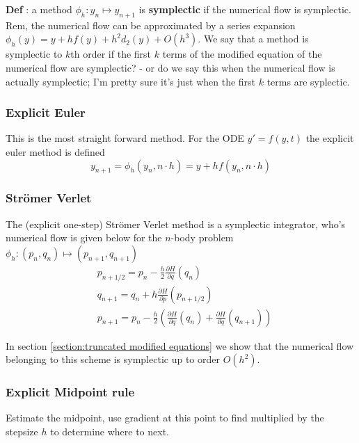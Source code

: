 \documentclass[12pt]{article}
\begin{document}
\textbf{Def} : a method $\phi_h : y_n\mapsto y_{n+1}$ is \textbf{symplectic} if the numerical flow is symplectic. Rem, the numerical flow can be approximated by a series expansion $\phi_h(y) = y + hf(y) + h^2d_2(y) + O(h^3)$. We say that a method is symplectic to $k$th order if the first $k$ terms of the modified equation of the numerical flow are symplectic? - or do we say this when the numerical flow is actually symplectic; I'm pretty sure it's just when the first $k$ terms are syplectic. 

\subsubsection{Explicit Euler}
This is the most straight forward method. For the ODE $y' = f(y,t)$ the explicit euler method is defined
\begin{equation}\label{eq:explicit euler}
y_{n+1} = \phi_h(y_n , n\cdot h) = y + h f(y_n, n\cdot h)
\end{equation}

\subsubsection{Str\"omer Verlet}
The (explicit one-step) Str\"omer Verlet method is a symplectic integrator, who's numerical flow is given below for the $n$-body problem $\phi_h : (p_n,q_n)\mapsto (p_{n+1},q_{n+1})$
\begin{equation}\label{eq:stromer verlet n body}
\begin{split}
    & p_{n+1/2} = p_n - \frac{h}{2}\frac{\partial H}{\partial q}(q_n)\\
    & q_{n+1} = q_n + h \frac{\partial H}{\partial p}(p_{n+1/2})\\
    & p_{n+1} = p_n - \frac{h}{2}\left( \frac{\partial H}{\partial q}(q_n) + \frac{\partial H}{\partial q}(q_{n+1}) \right)
\end{split}
\end{equation}

In section \ref{section:truncated modified equations} we show that the numerical flow belonging to this scheme is symplectic up to order $O(h^2)$. 

\subsubsection{Explicit Midpoint rule}
Estimate the midpoint, use gradient at this point to find multiplied by the stepsize $h$ to determine where to next.
\end{document}
